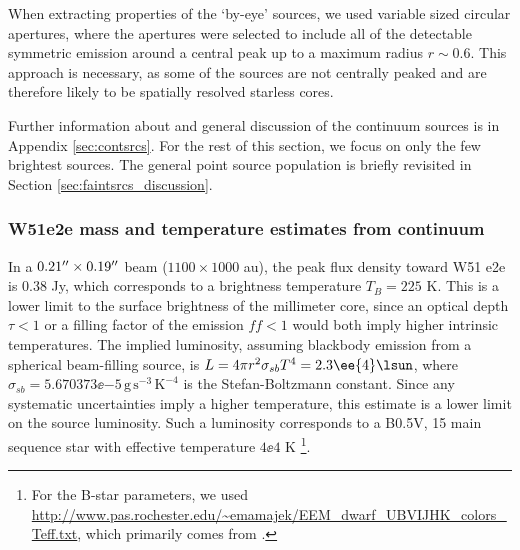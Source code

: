 \documentclass[twocolumn]{aastex61}
\begin{document}
When extracting properties of the `by-eye' sources, we used variable sized
circular apertures, where the apertures were selected to include all of the
detectable symmetric emission around a central peak up to a maximum radius
$r\sim0.6$\arcsec.  This approach is necessary, as some of the sources are not
centrally peaked and are therefore likely to be spatially resolved starless
cores.

Further information about and general discussion of the continuum sources is in
Appendix \ref{sec:contsrcs}.  For the rest of this section, we focus on only
the few brightest sources.  The general point source population is briefly
revisited in Section \ref{sec:faintsrcs_discussion}.








\subsubsection{W51e2e mass and temperature estimates from continuum}
\label{sec:W51e2e}

In a $0.21\mbox{$^{\prime\prime}$}\times0.19\mbox{$^{\prime\prime}$}$ beam ($1100\times1000$ au), the peak flux
density toward W51 e2e is 0.38 Jy, which corresponds to a brightness
temperature $T_B=225$ K.  This is a lower limit to the surface brightness of
the millimeter core, since an optical depth $\tau<1$ or a filling factor of the
emission $ff<1$ would both imply higher intrinsic temperatures.  The implied
luminosity, assuming blackbody emission from a spherical beam-filling source,
is $L = 4\pi r^2 \sigma_{sb} T^4 = 2.3\ee{4} \lsun$, where
$\sigma_{sb}=5.670373\ee{-5} \mathrm{\,g\,s^{-3}\,K^{-4}}$ is the
Stefan-Boltzmann constant.  Since any systematic
uncertainties imply a higher temperature, this estimate is a lower limit on the
source luminosity.  Such a luminosity corresponds to a B0.5V, 15 \msun main
sequence star with effective temperature $4\ee{4}$ K \citep[][see
Section \ref{sec:stellarproperties} for further discussion of
stellar types]{Pecaut2013a}\footnote{For the B-star parameters, we used
\url{http://www.pas.rochester.edu/~emamajek/EEM_dwarf_UBVIJHK_colors_Teff.txt},
which primarily comes from \citet{Pecaut2013a}.
}.
\end{document}
